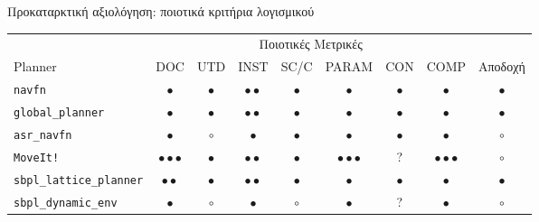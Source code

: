 \begin{frame}{Προκαταρκτική αξιολόγηση: ποιοτικά κριτήρια λογισμικού}


{\footnotesize
\begin{table}[h]%
\begin{tabular}{lccccccc|c}
  & \multicolumn{7}{c}{Ποιοτικές Μετρικές} \\
  \cline{2-8}
  Planner                                            & DOC                       & UTD         & INST              & SC/C      & PARAM                   & CON              & COMP                    & Αποδοχή      \\ \toprule
  \texttt{navfn}                                     & $\bullet$                 & $\bullet$   & $\bullet\bullet$  & $\bullet$ & $\bullet$               & $\bullet$        & $\bullet$               & $\bullet$    \\
  \texttt{global\_planner}                           & $\bullet$                 & $\bullet$   & $\bullet\bullet$  & $\bullet$ & $\bullet$               & $\bullet$        & $\bullet$               & $\bullet$    \\
  \textcolor{gr}{\texttt{asr\_navfn}}                & \textcolor{gr}{$\bullet$}                 & \textcolor{gr}{$\circ$}     & \textcolor{gr}{$\bullet$}         & \textcolor{gr}{$\bullet$} & \textcolor{gr}{$\bullet$}               & \textcolor{gr}{$\bullet$}        & \textcolor{gr}{$\bullet$}               & \textcolor{gr}{$\circ$}      \\
  \textcolor{gr}{\texttt{MoveIt!}}                   & \textcolor{gr}{$\bullet\bullet\bullet$}   & \textcolor{gr}{$\bullet$}   & \textcolor{gr}{$\bullet\bullet$}  & \textcolor{gr}{$\bullet$} & \textcolor{gr}{$\bullet\bullet\bullet$} & \textcolor{gr}{?}                & \textcolor{gr}{$\bullet\bullet\bullet$} & \textcolor{gr}{$\circ$}      \\
  \texttt{sbpl\_lattice\_planner}                    & $\bullet\bullet$          & $\bullet$   & $\bullet\bullet$  & $\bullet$ & $\bullet$               & $\bullet$ & $\bullet$               & $\bullet$    \\
  \textcolor{gr}{\texttt{sbpl\_dynamic\_env}}        &\textcolor{gr}{$\bullet$}                 & \textcolor{gr}{$\circ$}     & \textcolor{gr}{$\bullet$}         & \textcolor{gr}{$\circ$}   & \textcolor{gr}{$\bullet$}               & \textcolor{gr}{?}                & \textcolor{gr}{$\bullet$}               & \textcolor{gr}{$\circ$}      \\

\end{tabular}
\end{table}}
\end{frame}
